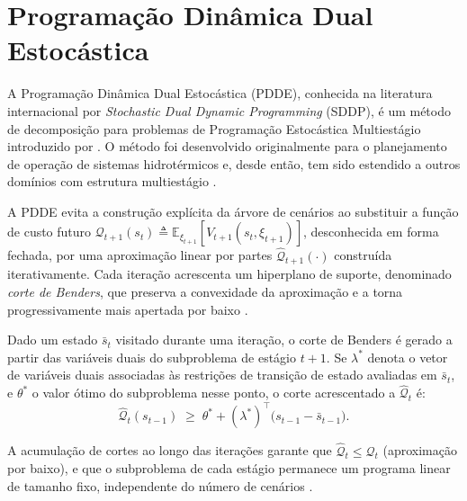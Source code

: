 \section{Programação Dinâmica Dual Estocástica}
\label{sec:pdde_literatura}

A Programação Dinâmica Dual Estocástica (PDDE), conhecida na literatura internacional por \emph{Stochastic Dual Dynamic Programming} (SDDP), é um método de decomposição para problemas de Programação Estocástica Multiestágio introduzido por . O método foi desenvolvido originalmente para o planejamento de operação de sistemas hidrotérmicos e, desde então, tem sido estendido a outros domínios com estrutura multiestágio \cite{dowson2021}.

A PDDE evita a construção explícita da árvore de cenários ao substituir a função de custo futuro $\mathcal{Q}_{t+1}(s_t) \triangleq \mathbb{E}_{\xi_{t+1}}[V_{t+1}(s_t, \xi_{t+1})]$, desconhecida em forma fechada, por uma aproximação linear por partes $\hat{\mathcal{Q}}_{t+1}(\cdot)$ construída iterativamente. Cada iteração acrescenta um hiperplano de suporte, denominado \emph{corte de Benders}, que preserva a convexidade da aproximação e a torna progressivamente mais apertada por baixo \cite{pereira1991}.

Dado um estado $\bar{s}_t$ visitado durante uma iteração, o corte de Benders é gerado a partir das variáveis duais do subproblema de estágio $t+1$. Se $\lambda^*$ denota o vetor de variáveis duais associadas às restrições de transição de estado avaliadas em $\bar{s}_t$, e $\theta^*$ o valor ótimo do subproblema nesse ponto, o corte acrescentado a $\hat{\mathcal{Q}}_t$ é:
\begin{equation}
  \hat{\mathcal{Q}}_t(s_{t-1}) \;\geq\; \theta^* + (\lambda^*)^\top \bigl(s_{t-1} - \bar{s}_{t-1}\bigr).
  \label{eq:benders_cut}
\end{equation}

A acumulação de cortes ao longo das iterações garante que $\hat{\mathcal{Q}}_t \leq \mathcal{Q}_t$ (aproximação por baixo), e que o subproblema de cada estágio permanece um programa linear de tamanho fixo, independente do número de cenários \cite{pereira1991,shapiro2009}.

